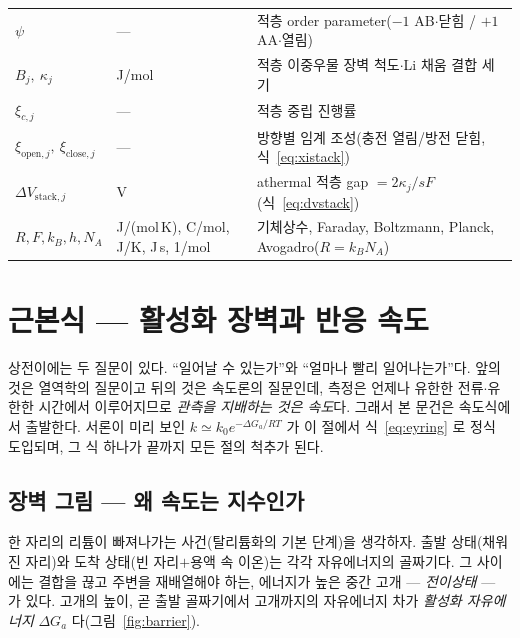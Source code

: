 \documentclass[11pt,a4paper]{article}
\begin{document}
\begin{longtable}{p{} p{} p{}}
$\psi$ & --- & 적층 order parameter($-1$ AB$\cdot$닫힘 / $+1$ AA$\cdot$열림) \\
$B_j,\ \kappa_j$ & J/mol & 적층 이중우물 장벽 척도$\cdot$Li 채움 결합 세기 \\
$\xi_{c,j}$ & --- & 적층 중립 진행률 \\
$\xi_{\mathrm{open},j},\ \xi_{\mathrm{close},j}$ & --- & 방향별 임계 조성(충전 열림/방전 닫힘, 식~\eqref{eq:xistack}) \\
$\Delta V_{\mathrm{stack},j}$ & V & athermal 적층 gap $=2\kappa_j/sF$(식~\eqref{eq:dvstack}) \\
$R,F,k_B,h,N_A$ & {\footnotesize J/(mol\,K), C/mol, J/K, J\,s, 1/mol} & 기체상수, Faraday, Boltzmann, Planck, Avogadro($R=k_BN_A$) \\
\bottomrule
\end{longtable}

\section{근본식 — 활성화 장벽과 반응 속도}\label{sec:rate}
상전이에는 두 질문이 있다. ``일어날 수 있는가''와 ``얼마나 빨리 일어나는가''다. 앞의 것은 열역학의 질문이고
뒤의 것은 속도론의 질문인데, 측정은 언제나 유한한 전류$\cdot$유한한 시간에서 이루어지므로 \emph{관측을
지배하는 것은 속도}다. 그래서 본 문건은 속도식에서 출발한다. 서론이 미리 보인 $k\simeq k_0e^{-\Delta G_a/RT}$ 가 이
절에서 식~\eqref{eq:eyring} 로 정식 도입되며, 그 식 하나가 끝까지 모든 절의 척추가 된다.

\subsection{장벽 그림 — 왜 속도는 지수인가}
한 자리의 리튬이 빠져나가는 사건(탈리튬화의 기본 단계)을 생각하자. 출발 상태(채워진 자리)와 도착 상태(빈
자리$+$용액 속 이온)는 각각 자유에너지의 골짜기다. 그 사이에는 결합을 끊고 주변을 재배열해야 하는, 에너지가
높은 중간 고개 — \emph{전이상태} — 가 있다. 고개의 높이, 곧 출발 골짜기에서 고개까지의 자유에너지 차가
\emph{활성화 자유에너지} $\Delta G_a$ 다(그림~\ref{fig:barrier}).
\end{document}
